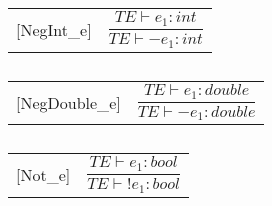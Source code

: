 \begin{table}[H]
    \begin{center}
    \begin{longtable}[c] { r c }
        [NegInt_{e}] 
        & 
        \( \dfrac{T E  \vdash  e_1  :  int}{T E  \vdash  -e_1  :  int} \) 
    \end{longtable}
    \caption{}\label{s-empty}
        \end{center}
\end{table}

\begin{table}[H]
    \begin{center}
    \begin{longtable}[c] { r c }
        [NegDouble_{e}] 
        & 
        \( \dfrac{T E  \vdash  e_1  :  double}{T E  \vdash  -e_1  :  double} \) 
    \end{longtable}
    \caption{}\label{s-empty}
        \end{center}
\end{table}

\begin{table}[H]
    \begin{center}
    \begin{longtable}[c] { r c }
        [Not_{e}] 
        & 
        \( \dfrac{T E  \vdash  e_1  :  bool}{T E  \vdash  !e_1  :  bool} \) 
    \end{longtable}
    \caption{}\label{s-empty}
        \end{center}
\end{table}

